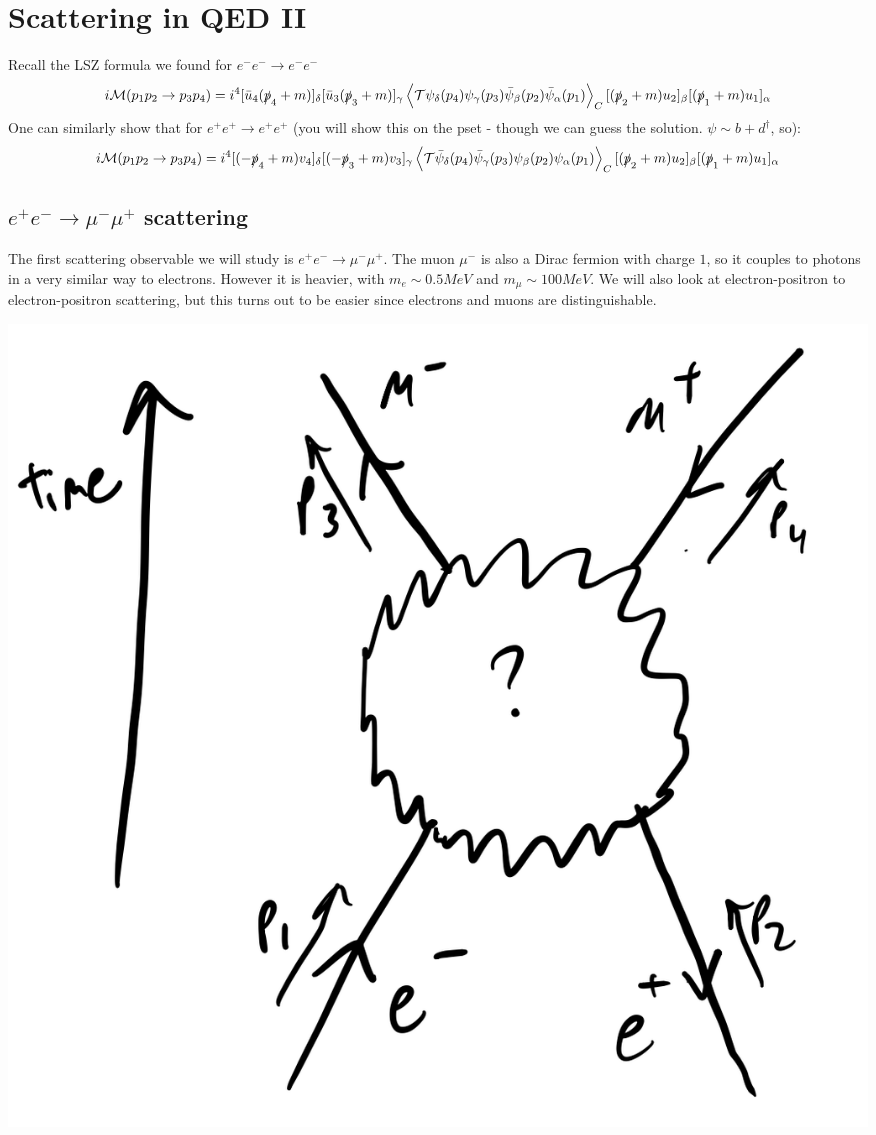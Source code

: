 \section{Scattering in QED II}
Recall the LSZ formula we found for $e^-e^-\to e^-e^-$
\begin{equation}
    i\mathcal{M}(p_1p_2\to p_3p_4) = i^4[\bar{u}_4(\slashed{p}_4 + m)]_\delta [\bar{u}_3(\slashed{p}_3 + m)]_\gamma \left< \mathcal{T}\psi_\delta(p_4)\psi_\gamma(p_3)\bar{\psi}_\beta(p_2)\bar{\psi}_\alpha(p_1) \right>_C[(\slashed{p}_2 + m)u_2]_\beta[(\slashed{p}_1 + m)u_1]_\alpha
\end{equation}
One can similarly show that for $e^+e^+ \to e^+e^+$ (you will show this on the pset - though we can guess the solution. $\psi \sim b + d^\dag$, so):
\begin{equation}
    i\mathcal{M}(p_1p_2\to p_3p_4) = i^4[(-\slashed{p}_4 + m)v_4]_\delta [(-\slashed{p}_3 + m)v_3]_\gamma \left< \mathcal{T}\bar{\psi}_\delta(p_4)\bar{\psi}_\gamma(p_3)\psi_\beta(p_2)\psi_\alpha(p_1) \right>_C[(\slashed{p}_2 + m)u_2]_\beta[(\slashed{p}_1 + m)u_1]_\alpha
\end{equation}

\subsection{$e^+e^-\to\mu^-\mu^+$ scattering}

The first scattering observable we will study is $e^+e^- \to \mu^-\mu^+$. The muon $\mu^-$ is also a Dirac fermion with charge $1$, so it couples to photons in a very similar way to electrons. However it is heavier, with $m_e \sim 0.5\si{MeV}$ and $m_\mu \sim 100\si{MeV}$. We will also look at electron-positron to electron-positron scattering, but this turns out to be easier since electrons and muons are distinguishable.

\begin{center}
    \includegraphics[scale=0.35]{Lectures/Images/lec13-mumuee.png}
\end{center}

